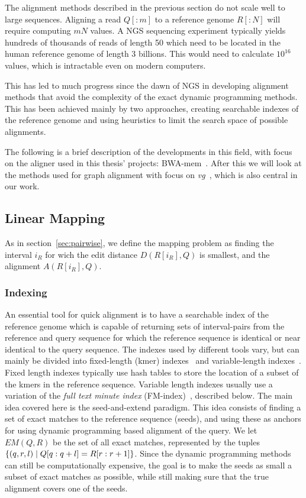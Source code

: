 The alignment methods described in the previous section do not scale well to large sequences.
Aligning a read $Q[:m]$ to a reference genome $R[:N]$ will require computing $mN$ values.
A NGS sequencing experiment typically yields hundreds of thousands of reads of length 50 which need to be located in the human reference genome of length 3 billions.
This would need to calculate $10^{16}$ values, which is intractable even on modern computers. 

This has led to much progress since the dawn of NGS in developing alignment methods that avoid the complexity of the exact dynamic programming methods.
This has been achieved mainly by two approaches, creating searchable indexes of the reference genome and using heuristics to limit the search space of possible alignments.

The following is a brief description of the developments in this field, with focus on the aligner used in this thesis' projects: BWA-mem~\cite{bwamem}.
After this we will look at the methods used  for graph alignment with focus on \emph{vg}~\cite{vg}, which is also central in our work.

\subsection{Linear Mapping}
As in section~\ref{sec:pairwise}, we define the mapping problem as finding the interval $i_R$ for wich the edit distance $D(R[i_R], Q)$ is smallest, and the alignment $A(R[i_R], Q)$.

\subsubsection{Indexing}
An essential tool for quick alignment is to have a searchable index of the reference genome which is capable of returning sets of interval-pairs from the reference and query sequence for which the reference sequence is identical or near identical to the query sequence.
The indexes used by different tools vary, but can mainly be divided into fixed-length (kmer) indexes~\cite{minimap} and variable-length indexes~\cite{bowtie2, bwalong}.
Fixed length indexes typically use hash tables to store the location of a subset of the kmers in the reference sequence.
Variable length indexes usually use a variation of the \emph{full text minute index} (FM-index)~\cite{fm}, described below.
The main idea covered here is the seed-and-extend paradigm.
This idea consists of finding a set of exact matches to the reference sequence (seeds), and using these as anchors for using dynamic programming based alignment of the query.
We let $EM(Q, R)$ be the set of all exact matches, represented by the tuples $\left\{(q, r, l) \mid Q[q:q+l]=R[r:r+1]\right\}$.
Since the dynamic programming methods can still be computationally expensive, the goal is to make the seeds as small a subset of exact matches as possible, while still making sure that the true alignment covers one of the seeds.

